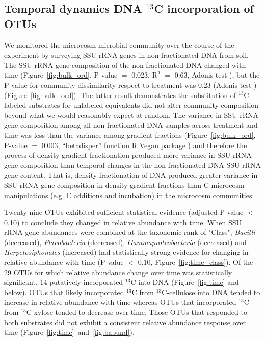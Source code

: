 \subsection{Temporal dynamics DNA $^{13}$C incorporation of OTUs}
We monitored the microcosm microbial community over the course of the
experiment by surveying SSU rRNA genes in non-fractionated DNA from soil. The
SSU rRNA gene composition of the non-fractionated DNA changed with time
(Figure~\ref{fig:bulk_ord}, P-value $=$ 0.023, R$^{2}$ $=$ 0.63, Adonis test
\citep{Anderson2001a}), but the P-value for community dissimilarity respect to
treatment was 0.23 (Adonis test \citep{Anderson2001a})
(Figure~\ref{fig:bulk_ord}). The latter result demonstrates the substitution of
$^{13}$C-labeled substrates for unlabeled equivalents did not alter community
composition beyond what we would reasonably expect at random. The variance in
SSU rRNA gene composition among all non-fractionated DNA samples across
treatment and time was less than the variance among gradient fractions
(Figure~\ref{fig:bulk_ord}, P-value $=$ 0.003, “betadisper” function R Vegan
package \citep{oksanen2007vegan}) and therefore the process of density gradient
fractionation produced more variance in SSU rRNA gene composition than temporal
changes in the non-fractionated DNA SSU rRNA gene content. That is, density
fractionation of DNA produced greater variance in SSU rRNA gene composition in
density gradient fractions than C microcosm manipulations (e.g. C additions and
incubation) in the microcosm communities.

Twenty-nine OTUs exhibited sufficient statistical evidence (adjusted P-value
$<$ 0.10) to conclude they changed in relative
abundance with time. When SSU rRNA gene abundances were combined at the
taxonomic rank of "Class", \textit{Bacilli} (decreased), \textit{Flavobacteria}
(decreased), \textit{Gammaproteobacteria} (decreased) and
\textit{Herpetosiphonales} (increased) had statistically strong evidence for
changing in relative abundance with time (P-value $<$ 0.10,
Figure~\ref{fig:time_class}). Of the 29
OTUs for which relative abundance change over time was statistically
significant, 14 putatively incorporated $^{13}$C into DNA
(Figure~\ref{fig:time} and below). OTUs that likely incorporated $^{13}$C from
$^{13}$C-cellulose into DNA tended to increase in relative abundance with time
whereas OTUs that incorporated $^{13}$C from $^{13}$C-xylose tended to decrease
over time. Those OTUs that responded to both substrates did not exhibit
a consistent relative abundance response over time
(Figure~\ref{fig:time}~and~\ref{fig:babund}).

